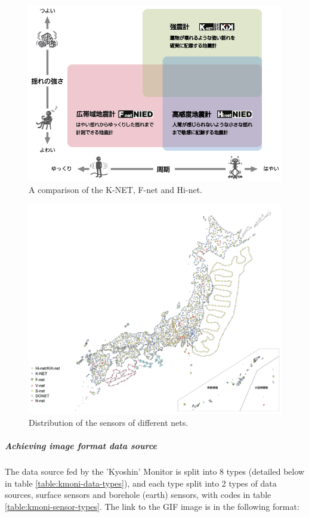 \documentclass[10pt]{article}
\begin{document}
\begin{figure}[!ht]
    \centering
    \includegraphics[width = 0.75\linewidth]{net-comparison.png}
    \caption{A comparison of the K-NET, F-net and Hi-net.}
    \label{fig:net-comparison}
\end{figure}

\begin{figure}[!ht]
    \centering
    \includegraphics[width = 0.75\linewidth]{net-distribution.png}
    \caption{Distribution of the sensors of different nets.}
    \label{fig:net-distribution}
\end{figure}


\subparagraph{Achieving image format data source}

The data source fed by the 'Kyoshin' Monitor is split into 8 types (detailed below in table \ref{table:kmoni-data-types}), and each type split into 2 types of data sources, surface sensors and borehole (earth) sensors, with codes in table \ref{table:kmoni-sensor-types}. The link to the GIF image is in the following format:
\end{document}
